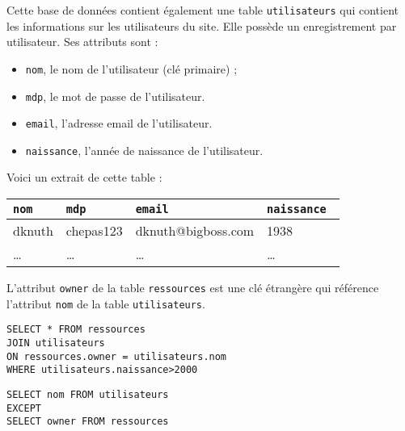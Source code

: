 \documentclass[11pt,a4paper]{article}
\begin{document}
\begin{Exercise}[title = {Base de données et {\sc sql}}, origin = {\bac \; {\sc capes nsi 2021}, épreuve 1} ]
	\NRet
	Cette base de données contient également une table {\tt utilisateurs} qui contient les informations sur les utilisateurs du site. Elle possède un enregistrement par utilisateur. Ses attributs sont :
	\begin{itemize}
		\item {\tt nom}, le nom de l'utilisateur (clé primaire) ;
		\item {\tt mdp}, le mot de passe de l'utilisateur.
		\item {\tt email}, l'adresse email de l'utilisateur.
		\item {\tt naissance}, l'année de naissance de l'utilisateur.
	\end{itemize}
	Voici un extrait de cette table :
	\medskip
	\begin{center}
		\begin{tabular}{|l|l|l|l|}
			\hline
			{\tt nom} & {\tt mdp} & {\tt email}        & {\tt naissance } \\
			\hline
			dknuth    & chepas123 & dknuth@bigboss.com & 1938             \\
			\hline
			\dots     & \dots     & \dots              & \dots            \\
		\end{tabular}
	\end{center}
	L'attribut {\tt owner} de la table {\tt ressources} est une clé étrangère qui référence l'attribut {\tt nom} de la table {\tt utilisateurs}.
	\Ret
	\ifcorrige
		\begin{verbatim}
SELECT * FROM ressources
JOIN utilisateurs
ON ressources.owner = utilisateurs.nom
WHERE utilisateurs.naissance>2000
\end{verbatim}
	\fi
	\ifcorrige
		\begin{verbatim}
SELECT nom FROM utilisateurs
EXCEPT 
SELECT owner FROM ressources
\end{verbatim}
	\fi
\end{Exercise}
\end{document}
